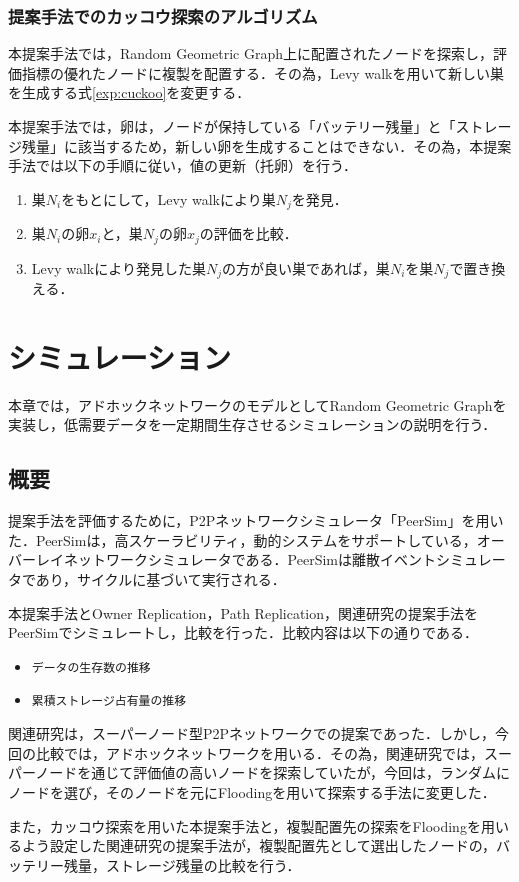 \documentclass[11pt]{jreport}
\begin{document}
\subsection{提案手法でのカッコウ探索のアルゴリズム}
本提案手法では，Random Geometric Graph上に配置されたノードを探索し，評価指標の優れたノードに複製を配置する．その為，Levy walkを用いて新しい巣を生成する式\ref{exp:cuckoo}を変更する．
\par 本提案手法では，卵は，ノードが保持している「バッテリー残量」と「ストレージ残量」に該当するため，新しい卵を生成することはできない．その為，本提案手法では以下の手順に従い，値の更新（托卵）を行う．

\begin{enumerate}
	\item 巣$N_i$をもとにして，Levy walkにより巣$N_j$を発見．
	\item 巣$N_i$の卵$x_i$と，巣$N_j$の卵$x_j$の評価を比較．
	\item Levy walkにより発見した巣$N_j$の方が良い巣であれば，巣$N_i$を巣$N_j$で置き換える．
\end{enumerate}



\chapter{シミュレーション}
本章では，アドホックネットワークのモデルとしてRandom Geometric Graphを実装し，低需要データを一定期間生存させるシミュレーションの説明を行う．

\section{概要}
提案手法を評価するために，P2Pネットワークシミュレータ「PeerSim\cite{peersim}」を用いた．PeerSimは，高スケーラビリティ，動的システムをサポートしている，オーバーレイネットワークシミュレータである．PeerSimは離散イベントシミュレータであり，サイクルに基づいて実行される．
\par 本提案手法とOwner Replication，Path Replication，関連研究の提案手法をPeerSimでシミュレートし，比較を行った．比較内容は以下の通りである．

\begin{itemize}
	\item {\tt データの生存数の推移}
	\item {\tt 累積ストレージ占有量の推移}
\end{itemize}

\par 関連研究は，スーパーノード型P2Pネットワークでの提案であった．しかし，今回の比較では，アドホックネットワークを用いる．その為，関連研究では，スーパーノードを通じて評価値の高いノードを探索していたが，今回は，ランダムにノードを選び，そのノードを元にFloodingを用いて探索する手法に変更した．
\par また，カッコウ探索を用いた本提案手法と，複製配置先の探索をFloodingを用いるよう設定した関連研究の提案手法が，複製配置先として選出したノードの，バッテリー残量，ストレージ残量の比較を行う．
\end{document}
